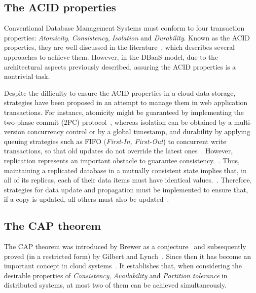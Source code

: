 \subsection{The ACID properties}

Conventional Database Management Systems must conform to four transaction properties: \textit{Atomicity}, \textit{Consistency}, \textit{Isolation} and \textit{Durability}. Known as the ACID properties, they are well discussed in the literature~\cite{acid1983}, which describes several approaches to achieve them. However, in the DBaaS model, due to the architectural aspects previously described, assuring the ACID {properties} is a nontrivial task. 

Despite the difficulty to ensure the ACID properties in a cloud data storage, strategies have been proposed in an attempt to manage them in web application transactions. For instance, atomicity might be guaranteed by implementing the two-phase commit (2PC) protocol~\cite{gray1978dbos}, whereas isolation can be obtained by a multi-version concurrency control %
or by a global timestamp, 
and durability %
by applying queuing strategies such as FIFO (\emph{First-In, First-Out}) to concurrent write transactions, so that old updates do not override the latest ones~\cite{Wei:2009}. 
However, replication represents an important obstacle to guarantee consistency.~\cite{Abadi09}. 
Thus, maintaining a replicated database in a mutually consistent state implies that, in all of its replicas, each of their data items must have identical values.~\cite{OzsuValduriez:2011}. 
Therefore, strategies for data update and propagation must be implemented to ensure that, if a copy is updated, all others must also be updated~\cite{tanenbaum:2007}.

\subsection{The CAP theorem}
\label{sec:2.3}
The CAP theorem was introduced by Brewer as a conjecture~\cite{Brewer2000} and subsequently proved (in  a restricted form) by Gilbert and  Lynch~\cite{Gilbert:2002}. 
Since then it has become an important concept in cloud systems~\cite{brewer2012}.
It establishes that, when considering the desirable properties of \textit{Consistency}, \textit{Availability} and %
\textit{Partition  tolerance}
in distributed systems, at most two of them can be achieved simultaneously. 

